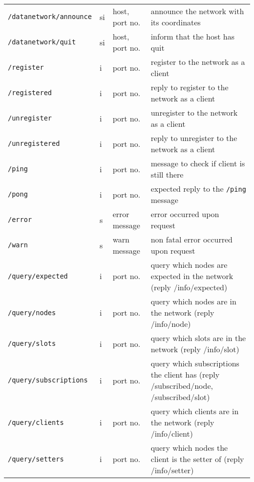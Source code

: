 \documentclass[letterpaper,10pt]{article}
\begin{document}
\begin{sidewaystable}[!tbp]
\small
\begin{center}
\begin{tabular}{|llll|}
\hline
\verb|/datanetwork/announce| & si & host, port no. & announce the network with its coordinates \\
\verb|/datanetwork/quit| & si & host, port no. & inform that the host has quit \\

\verb|/register| & i & port no. & register to the network as a client \\
\verb|/registered| & i & port no. & reply to register to the network as a client \\

\verb|/unregister| & i & port no. & unregister to the network as a client \\  
\verb|/unregistered| & i & port no. & reply to unregister to the network as a client \\

\verb|/ping| & i & port no. &  message to check if client is still there \\
\verb|/pong| & i & port no. &  expected reply to the \verb|/ping| message \\

\verb|/error| & s & error message & error occurred upon request \\
\verb|/warn| & s & warn message & non fatal error occurred upon request \\  

\verb|/query/expected| & i & port no.& query which nodes are expected in the network (reply /info/expected) \\
\verb|/query/nodes| & i & port no.& query which nodes are in the network (reply /info/node) \\
\verb|/query/slots| & i & port no.& query which slots are in the network (reply /info/slot)\\
\verb|/query/subscriptions| & i & port no.& query which subscriptions the client has (reply /subscribed/node, /subscribed/slot)\\
\verb|/query/clients| & i & port no.& query which clients are in the network (reply /info/client)\\
\verb|/query/setters| & i & port no.& query which nodes the client is the setter of (reply /info/setter) \\


\end{tabular}
\end{center}
\end{sidewaystable}
\end{document}
